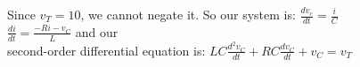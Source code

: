 \documentclass[preview]{standalone}
\begin{document}
\begin{center}
\raggedright
                    Since $v_T = 10$, we cannot negate it. So our system is:
                        $\frac{dv_c}{dt} = \frac{i}{C}$ \\
                        $\frac{di}{dt} = \frac{-Ri - v_C}{L}$
                and our \\
                    second-order differential equation is: 
                        $ LC\frac{d^2v_C}{dt} + RC\frac{dv_C}{dt} + v_C = v_T $
\end{center}
\end{document}
